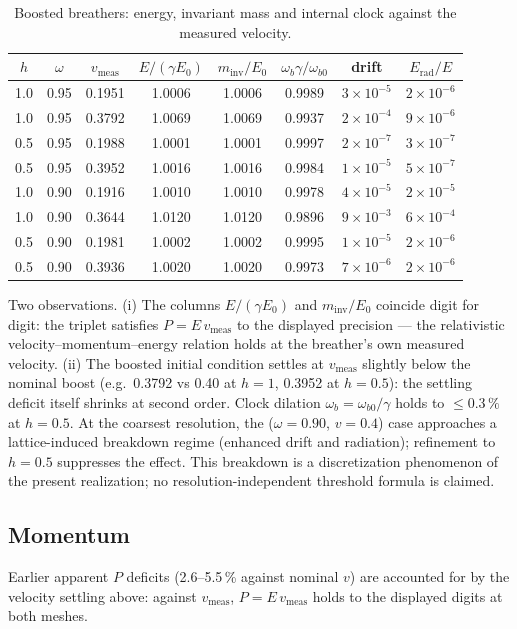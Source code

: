 \documentclass[11pt,a4paper]{article}
\theoremstyle{plain}
\theoremstyle{remark}
\begin{document}
\begin{table}[htbp]
\centering\small
\begin{tabular}{cccccccc}
\toprule
$h$ & $\omega$ & $v_{\text{meas}}$ & $E/(\gamma E_0)$ & $m_{\text{inv}}/E_0$ & $\omega_b\gamma/\omega_{b0}$ & drift & $E_{\text{rad}}/E$ \\
\midrule
1.0 & 0.95 & 0.1951 & 1.0006 & 1.0006 & 0.9989 & $3\times10^{-5}$ & $2\times10^{-6}$ \\
1.0 & 0.95 & 0.3792 & 1.0069 & 1.0069 & 0.9937 & $2\times10^{-4}$ & $9\times10^{-6}$ \\
0.5 & 0.95 & 0.1988 & 1.0001 & 1.0001 & 0.9997 & $2\times10^{-7}$ & $3\times10^{-7}$ \\
0.5 & 0.95 & 0.3952 & 1.0016 & 1.0016 & 0.9984 & $1\times10^{-5}$ & $5\times10^{-7}$ \\
1.0 & 0.90 & 0.1916 & 1.0010 & 1.0010 & 0.9978 & $4\times10^{-5}$ & $2\times10^{-5}$ \\
1.0 & 0.90 & 0.3644 & 1.0120 & 1.0120 & 0.9896 & $9\times10^{-3}$ & $6\times10^{-4}$ \\
0.5 & 0.90 & 0.1981 & 1.0002 & 1.0002 & 0.9995 & $1\times10^{-5}$ & $2\times10^{-6}$ \\
0.5 & 0.90 & 0.3936 & 1.0020 & 1.0020 & 0.9973 & $7\times10^{-6}$ & $2\times10^{-6}$ \\
\bottomrule
\end{tabular}
\caption{Boosted breathers: energy, invariant mass and internal clock against the measured velocity.}
\label{tab:breather_boost}
\end{table}

Two observations. (i) The columns $E/(\gamma E_0)$ and $m_{\text{inv}}/E_0$ coincide digit for digit: the triplet satisfies $P = E\,v_{\text{meas}}$ to the displayed precision --- the relativistic velocity--momentum--energy relation holds at the breather's own measured velocity. (ii) The boosted initial condition settles at $v_{\text{meas}}$ slightly below the nominal boost (e.g.\ 0.3792 vs 0.40 at $h=1$, 0.3952 at $h=0.5$): the settling deficit itself shrinks at second order. Clock dilation $\omega_b = \omega_{b0}/\gamma$ holds to $\le 0.3\,\%$ at $h = 0.5$. At the coarsest resolution, the ($\omega = 0.90$, $v = 0.4$) case approaches a lattice-induced breakdown regime (enhanced drift and radiation); refinement to $h = 0.5$ suppresses the effect. This breakdown is a discretization phenomenon of the present realization; no resolution-independent threshold formula is claimed.

\subsection{Momentum}
Earlier apparent $P$ deficits (2.6--5.5\,\% against nominal $v$) are accounted for by the velocity settling above: against $v_{\text{meas}}$, $P = E\,v_{\text{meas}}$ holds to the displayed digits at both meshes.
\end{document}
